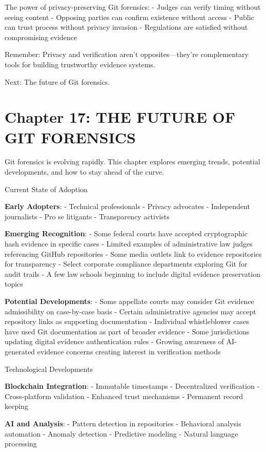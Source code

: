 The power of privacy-preserving Git forensics: - Judges can verify
timing without seeing content - Opposing parties can confirm existence
without access - Public can trust process without privacy invasion -
Regulations are satisfied without compromising evidence

Remember: Privacy and verification aren't opposites---they're
complementary tools for building trustworthy evidence systems.

Next: The future of Git forensics.

\section{Chapter 17: THE FUTURE OF GIT
FORENSICS}\label{chapter-17-the-future-of-git-forensics}

Git forensics is evolving rapidly. This chapter explores emerging
trends, potential developments, and how to stay ahead of the curve.

Current State of Adoption

\textbf{Early Adopters}: - Technical professionals - Privacy advocates -
Independent journalists - Pro se litigants - Transparency activists

\textbf{Emerging Recognition}: - Some federal courts have accepted
cryptographic hash evidence in specific cases - Limited examples of
administrative law judges referencing GitHub repositories - Some media
outlets link to evidence repositories for transparency - Select
corporate compliance departments exploring Git for audit trails - A few
law schools beginning to include digital evidence preservation topics

\textbf{Potential Developments}: - Some appellate courts may consider
Git evidence admissibility on case-by-case basis - Certain
administrative agencies may accept repository links as supporting
documentation - Individual whistleblower cases have used Git
documentation as part of broader evidence - Some jurisdictions updating
digital evidence authentication rules - Growing awareness of
AI-generated evidence concerns creating interest in verification methods

Technological Developments

\textbf{Blockchain Integration}: - Immutable timestamps - Decentralized
verification - Cross-platform validation - Enhanced trust mechanisms -
Permanent record keeping

\textbf{AI and Analysis}: - Pattern detection in repositories -
Behavioral analysis automation - Anomaly detection - Predictive modeling
- Natural language processing

